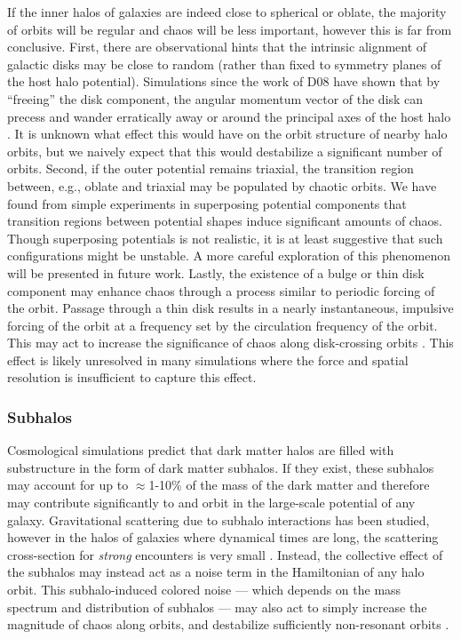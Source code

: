 \documentclass[letterpaper,12pt,preprint]{aastex}
\begin{document}
If the inner halos of galaxies are indeed close to spherical or oblate, the majority of orbits will be regular and chaos will be less important, however this is far from conclusive. First, there are observational hints that the intrinsic alignment of galactic disks may be close to random \citep{??} (rather than fixed to symmetry planes of the host halo potential). Simulations since the work of D08 have shown that by ``freeing'' the disk component, the angular momentum vector of the disk can precess and wander erratically away or around the principal axes of the host halo \citep{debattista15}. It is unknown what effect this would have on the orbit structure of nearby halo orbits, but we naively expect that this would destabilize a significant number of orbits. Second, if the outer potential remains triaxial, the transition region between, e.g., oblate and triaxial may be populated by chaotic orbits. We have found from simple experiments in superposing potential components that transition regions between potential shapes induce significant amounts of chaos. Though superposing potentials is not realistic, it is at least suggestive that such configurations might be unstable. A more careful exploration of this phenomenon will be presented in future work. Lastly, the existence of a bulge or thin disk component may enhance chaos through a process similar to periodic forcing of the orbit. Passage through a thin disk results in a nearly instantaneous, impulsive forcing of the orbit at a frequency set by the circulation frequency of the orbit. This may act to increase the significance of chaos along disk-crossing orbits \citep[e.g.,][]{kandrup00, hunter05}. This effect is likely unresolved in many simulations where the force and spatial resolution is insufficient to capture this effect.

\subsubsection{Subhalos}

Cosmological simulations predict that dark matter halos are filled with substructure in the form of dark matter subhalos. If they exist, these subhalos may account for up to $\approx$1-10\% of the mass of the dark matter \citep{??} and therefore may contribute significantly to and orbit in the large-scale potential of any galaxy. Gravitational scattering due to subhalo interactions has been studied, however in the halos of galaxies where dynamical times are long, the scattering cross-section for \emph{strong} encounters is very small \citep{??}. Instead, the collective effect of the subhalos may instead act as a noise term in the Hamiltonian of any halo orbit. This subhalo-induced colored noise --- which depends on the mass spectrum and distribution of subhalos --- may also act to simply increase the magnitude of chaos along orbits, and destabilize sufficiently non-resonant orbits \citep[see, e.g.,][]{kandrup00}.
\end{document}
